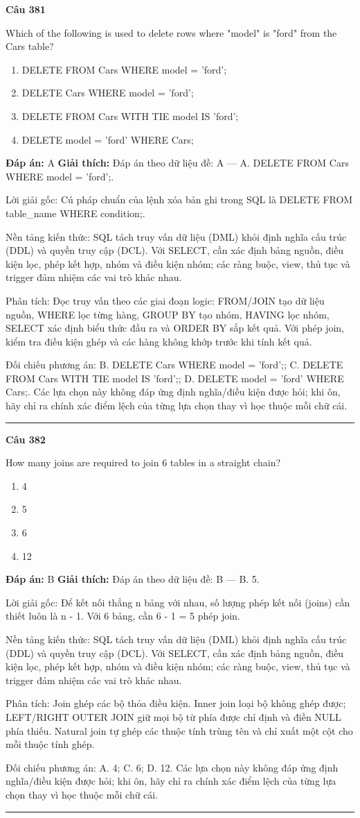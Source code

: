 \documentclass[11pt,a4paper]{article}
\newenvironment{question}[1]{%
  \par\vspace{1em}\noindent\textbf{\large Câu #1}\par\vspace{0.4em}
}{%
  \par\vspace{1em}\hrule\vspace{0.6em}
}
\newenvironment{choices}{%
  \begin{enumerate}[label=\textbf{\Alph*.},leftmargin=2.2em,itemsep=2pt,topsep=3pt]
}{%
  \end{enumerate}
}
\newcommand{\choice}{\item}
\begin{document}
\begin{question}{381}
Which of the following is used to delete rows where "model" is "ford" from the Cars table?
\begin{choices}
\choice DELETE FROM Cars WHERE model = 'ford';
\choice DELETE Cars WHERE model = 'ford';
\choice DELETE FROM Cars WITH TIE model IS 'ford';
\choice DELETE model = 'ford' WHERE Cars;
\end{choices}
\textbf{Đáp án:} A
\textbf{Giải thích:} Đáp án theo dữ liệu đề: A — A. DELETE FROM Cars WHERE model = 'ford';.

Lời giải gốc: Cú pháp chuẩn của lệnh xóa bản ghi trong SQL là DELETE FROM table_name WHERE condition;.

Nền tảng kiến thức: SQL tách truy vấn dữ liệu (DML) khỏi định nghĩa cấu trúc (DDL) và quyền truy cập (DCL). Với SELECT, cần xác định bảng nguồn, điều kiện lọc, phép kết hợp, nhóm và điều kiện nhóm; các ràng buộc, view, thủ tục và trigger đảm nhiệm các vai trò khác nhau.

Phân tích: Đọc truy vấn theo các giai đoạn logic: FROM/JOIN tạo dữ liệu nguồn, WHERE lọc từng hàng, GROUP BY tạo nhóm, HAVING lọc nhóm, SELECT xác định biểu thức đầu ra và ORDER BY sắp kết quả. Với phép join, kiểm tra điều kiện ghép và các hàng không khớp trước khi tính kết quả.

Đối chiếu phương án: B. DELETE Cars WHERE model = 'ford';; C. DELETE FROM Cars WITH TIE model IS 'ford';; D. DELETE model = 'ford' WHERE Cars;. Các lựa chọn này không đáp ứng định nghĩa/điều kiện được hỏi; khi ôn, hãy chỉ ra chính xác điểm lệch của từng lựa chọn thay vì học thuộc mỗi chữ cái.
\end{question}

\begin{question}{382}
How many joins are required to join 6 tables in a straight chain?
\begin{choices}
\choice 4
\choice 5
\choice 6
\choice 12
\end{choices}
\textbf{Đáp án:} B
\textbf{Giải thích:} Đáp án theo dữ liệu đề: B — B. 5.

Lời giải gốc: Để kết nối thẳng n bảng với nhau, số lượng phép kết nối (joins) cần thiết luôn là n - 1. Với 6 bảng, cần 6 - 1 = 5 phép join.

Nền tảng kiến thức: SQL tách truy vấn dữ liệu (DML) khỏi định nghĩa cấu trúc (DDL) và quyền truy cập (DCL). Với SELECT, cần xác định bảng nguồn, điều kiện lọc, phép kết hợp, nhóm và điều kiện nhóm; các ràng buộc, view, thủ tục và trigger đảm nhiệm các vai trò khác nhau.

Phân tích: Join ghép các bộ thỏa điều kiện. Inner join loại bộ không ghép được; LEFT/RIGHT OUTER JOIN giữ mọi bộ từ phía được chỉ định và điền NULL phía thiếu. Natural join tự ghép các thuộc tính trùng tên và chỉ xuất một cột cho mỗi thuộc tính ghép.

Đối chiếu phương án: A. 4; C. 6; D. 12. Các lựa chọn này không đáp ứng định nghĩa/điều kiện được hỏi; khi ôn, hãy chỉ ra chính xác điểm lệch của từng lựa chọn thay vì học thuộc mỗi chữ cái.
\end{question}
\end{document}
